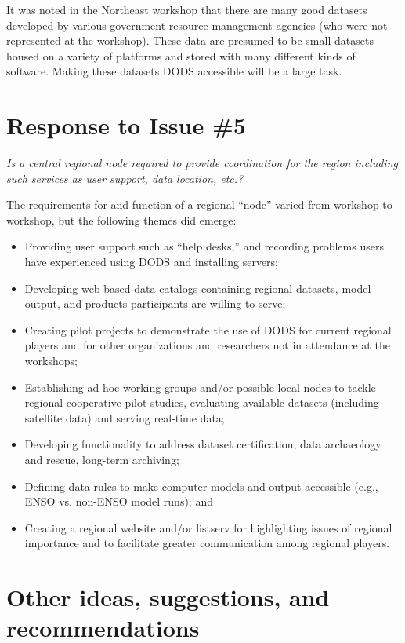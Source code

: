\documentclass{report}
\newcommand{\pause}{\vspace{10pt}}
\begin{document}
It was noted in the Northeast workshop that there are many good
datasets developed by various government resource management agencies
(who were not represented at the workshop).  These data are presumed
to be small datasets housed on a variety of platforms and stored with
many different kinds of software.  Making these datasets DODS
accessible will be a large task.

\section{Response to Issue \#5}

\emph{Is a central regional node required to provide coordination for the
region including such services as user support, data location, etc.?}\pause

The requirements for and function of a regional ``node'' varied from
workshop to workshop, but the following themes did emerge:

\begin{itemize}
\item Providing user support such as ``help desks,'' and recording
  problems users have experienced using DODS and installing servers;
\item Developing web-based data catalogs containing regional datasets,
  model output, and products participants are willing to serve;
\item Creating pilot projects to demonstrate the use of DODS for
  current regional players and for other organizations and researchers
  not in attendance at the workshops;
\item Establishing ad hoc working groups and/or possible local nodes
  to tackle regional cooperative pilot studies, evaluating available
  datasets (including satellite data) and serving real-time data;
\item Developing functionality to address dataset certification, data
  archaeology and rescue, long-term archiving;
\item Defining data rules to make computer models and output
  accessible (e.g., ENSO vs. non-ENSO model runs); and
\item Creating a regional website and/or listserv for highlighting
  issues of regional importance and to facilitate greater
  communication among regional players.
\end{itemize}


\section{Other ideas, suggestions, and recommendations}
\end{document}
